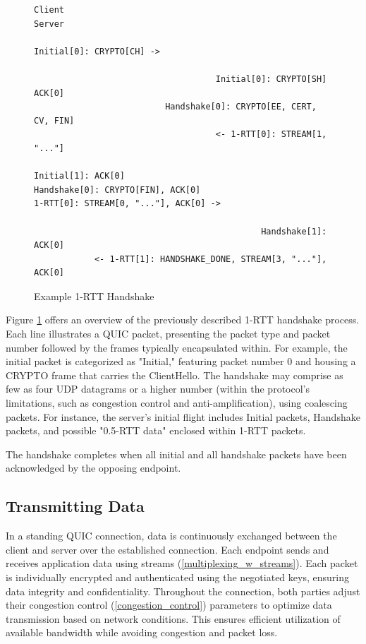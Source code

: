 \begin{figure}[htb]
    \centering      
\begin{verbatim}
Client                                                     Server

Initial[0]: CRYPTO[CH] ->

                                    Initial[0]: CRYPTO[SH] ACK[0]
                          Handshake[0]: CRYPTO[EE, CERT, CV, FIN]
                                    <- 1-RTT[0]: STREAM[1, "..."]

Initial[1]: ACK[0]
Handshake[0]: CRYPTO[FIN], ACK[0]
1-RTT[0]: STREAM[0, "..."], ACK[0] ->

                                             Handshake[1]: ACK[0]
            <- 1-RTT[1]: HANDSHAKE_DONE, STREAM[3, "..."], ACK[0]
\end{verbatim}
    \caption{Example 1-RTT Handshake\cite[35]{rfc9000}}
    \label{example_handshake}
\end{figure}

Figure \ref{example_handshake} offers an overview of the previously described 1-RTT handshake process. Each line illustrates a QUIC packet, presenting the packet type and packet number followed by the frames typically encapsulated within. For example, the initial packet is categorized as "Initial," featuring packet number 0 and housing a CRYPTO frame that carries the ClientHello. The handshake may comprise as few as four UDP datagrams or a higher number (within the protocol's limitations, such as congestion control and anti-amplification), using coalescing packets. For instance, the server's initial flight includes Initial packets, Handshake packets, and possible "0.5-RTT data" enclosed within 1-RTT packets.

The handshake completes when all initial and all handshake packets have been acknowledged by the opposing endpoint.

\subsection{Transmitting Data}

In a standing QUIC connection, data is continuously exchanged between the client and server over the established connection. Each endpoint sends and receives application data using streams (\ref{multiplexing_w_streams}). Each packet is individually encrypted and authenticated using the negotiated keys, ensuring data integrity and confidentiality. Throughout the connection, both parties adjust their congestion control (\ref{congestion_control}) parameters to optimize data transmission based on network conditions. This ensures efficient utilization of available bandwidth while avoiding congestion and packet loss.

